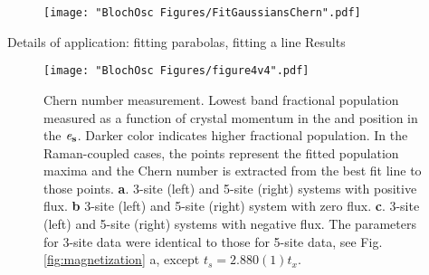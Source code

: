 \begin{figure}
\texttt{[image: "BlochOsc Figures/FitGaussiansChern".pdf]}
\caption{}
\label{fig:FitGaussiansChern}
\end{figure}
	Details of application: fitting parabolas, fitting a line
	Results

\begin{figure}
\texttt{[image: "BlochOsc Figures/figure4v4".pdf]}
\caption{Chern number measurement.  Lowest band fractional population measured as a function of crystal momentum in the  \ex  and position in the $\bf{\mathit{e}_s}$. Darker color indicates higher fractional population. In the Raman-coupled cases, the points represent the fitted population maxima and the Chern number is extracted from the best fit line to those points.  \textbf{a}. 3-site (left) and 5-site (right) systems with positive flux.  \textbf{b} 3-site (left) and 5-site (right) system with zero flux.  \textbf{c}. 3-site (left) and 5-site (right) systems with negative flux. The parameters for 3-site data were identical to those for 5-site data, see Fig. \ref{fig:magnetization} a, except $t_s =2.880(1)t_x$.}
\label{fig:finalData}
\end{figure}
	

